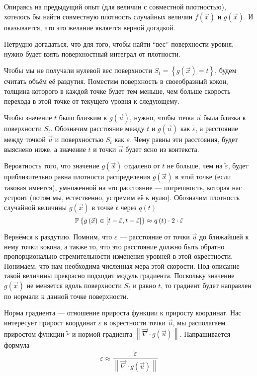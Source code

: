 Опираясь на предыдущий опыт (для величин с совместной плотностью),
хотелось бы найти совместную плотность случайных величин
$f\left( \vec{x} \right)$ и $g\left( \vec{x} \right)$.
И оказывается, что это желание является верной догадкой.

Нетрудно догадаться, что для того, чтобы найти ``вес'' поверхности уровня,
нужно будет взять поверхностный интеграл от плотности.

Чтобы мы не получали нулевой вес поверхности
$S_t = \left\{ g\left( \vec{x} \right) = t \right\}$,
будем считать объём её раздутия.
Поместим поверхность в своеобразный кокон,
толщина которого в каждой точке будет тем меньше,
чем больше скорость перехода в этой точке от текущего уровня к следующему.

Чтобы значение $t$ было близким к $g\left( \vec{u} \right)$,
нужно, чтобы точка $\vec{u}$ была близка к поверхности $S_t$.
Обозначим расстояние между $t$ и $g\left( \vec{u} \right)$
как $\tilde{\varepsilon}$,
а расстояние между точкой $\vec{u}$ и поверхностью $S_t$
как $\varepsilon$. Чему равны эти расстояния, будет выяснено ниже,
а значение $t$ и точки $\vec{u}$ будет ясно из контекста.

Вероятность того, что значение $g\left( \vec{x} \right)$
отдалено от $t$ не больше, чем на $\tilde{\varepsilon}$,
будет приблизительно равна плотности распределения $g\left( \vec{x} \right)$
в этой точке (если таковая имеется),
умноженной на это расстояние --- погрешность,
которая нас устроит (потом мы, естественно, устремим её к нулю).
Обозначим плотность случайной величины $g\left( \vec{x} \right)$
в точке $t$ через $q\left( t \right)$
$$\mathbb{P}\left\{ g\left( \vec{x} \right)
    \in \left[t-\tilde{\varepsilon}, t+\tilde{\varepsilon}\right] \right\}
    \approx q\left( t \right) \cdot 2 \cdot \tilde{\varepsilon}$$

Вернёмся к раздутию. Помним, что $\varepsilon$ --- расстояние от
точки $\vec{u}$ до ближайшей к нему точки кокона, а также то,
что это расстояние должно быть обратно пропорционально
стремительности изменения уровней в этой окрестности.
Понимаем, что нам необходима численная мера этой скорости.
Под описание такой величины прекрасно подходит модуль градиента.
Поскольку значение $g\left( \vec{x} \right)$ не меняется вдоль поверхности $S_t$
и равно $t$, то градиент будет направлен по нормали к данной точке поверхности.

Норма градиента --- отношение прироста функции к приросту координат.
Нас интересует прирост координат $\varepsilon$ в окрестности точки $\vec{u}$,
мы располагаем приростом функции $\tilde{\varepsilon}$
и нормой градиента
$\left\| \vec{\nabla} \cdot {g\left( \vec{u} \right)} \right\|$.
Напрашивается формула
\begin{equation}\label{widthEpsilon}
    \varepsilon \approx \frac{\tilde{\varepsilon}}
        {\left\| \vec{\nabla} \cdot g\left( \vec{u} \right) \right\|}
\end{equation}

